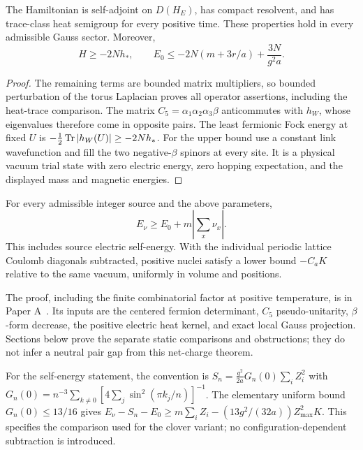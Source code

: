 \begin{lemma}\label{lat-realization}
The Hamiltonian is self-adjoint on $D(H_E)$, has compact resolvent,
and has trace-class heat semigroup for every positive time. These
properties hold in every admissible Gauss sector. Moreover,
\[
 H\ge-2Nh_*,\qquad
 E_0\le-2N(m+3r/a)+\frac{3N}{g^2a}.
\]
\end{lemma}
\begin{proof}
The remaining terms are bounded matrix multipliers, so bounded
perturbation of the torus Laplacian proves all operator assertions,
including the heat-trace comparison. The matrix
$C_5=\alpha_1\alpha_2\alpha_3\beta$ anticommutes with $h_W$,
whose eigenvalues therefore come in opposite pairs.
The least fermionic Fock energy at fixed $U$ is
$-\frac12\operatorname{Tr}|h_W(U)|\ge-2Nh_*$. For the upper bound use a constant
link wavefunction and fill the two negative-$\beta$ spinors at every
site. It is a physical vacuum trial state with zero electric energy,
zero hopping expectation, and the displayed mass and magnetic energies.
\end{proof}

\begin{theorem}\label{lat-main}
For every admissible integer source and the above parameters,
\[
 E_\nu\ge E_0+m\left|\sum_x\nu_x\right|.
\]
This includes source electric self-energy. With the individual
periodic lattice Coulomb diagonals subtracted, positive nuclei
satisfy a lower bound $-C_aK$ relative to the same vacuum,
uniformly in volume and positions.
\end{theorem}
The proof, including the finite combinatorial factor at positive
temperature, is in Paper A~\cite{PaperA}. Its inputs are the centered
fermion determinant, $C_5$ pseudo-unitarity, $\beta$-form decrease,
the positive electric heat kernel, and exact local Gauss projection.
Sections below prove the separate static comparisons and obstructions;
they do not infer a neutral pair gap from this net-charge theorem.

For the self-energy statement, the convention is
$S_n=\frac{g^2}{2a}G_n(0)\sum_iZ_i^2$ with
$G_n(0)=n^{-3}\sum_{k\ne0}[4\sum_j\sin^2(\pi k_j/n)]^{-1}$.
The elementary uniform bound $G_n(0)\le13/16$ gives
$E_\nu-S_n-E_0\ge m\sum_iZ_i-(13g^2/(32a))Z_{\max}^2K$.
This specifies the comparison used for the clover variant; no
configuration-dependent subtraction is introduced.
